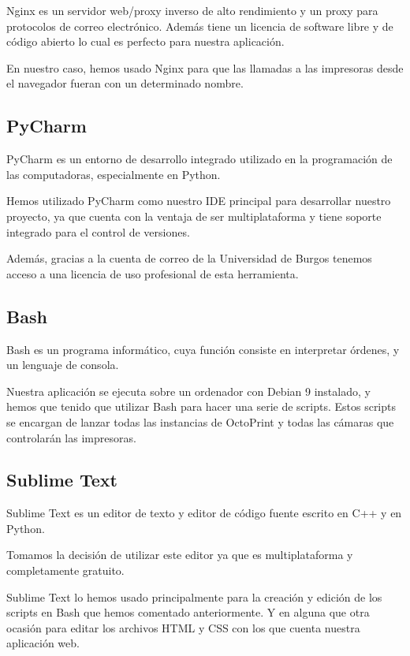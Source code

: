 Nginx \cite{wiki:nginx} es un servidor web/proxy inverso de alto rendimiento y un proxy para protocolos de correo electrónico. Además tiene un licencia de software libre y de código abierto lo cual es perfecto para nuestra aplicación.

En nuestro caso, hemos usado Nginx para que las llamadas a las impresoras desde el navegador fueran con un determinado nombre.

\subsection{PyCharm}

PyCharm \cite{wiki:pycharm} es un entorno de desarrollo integrado utilizado en la programación de las computadoras, especialmente en Python.

Hemos utilizado PyCharm como nuestro IDE principal para desarrollar nuestro proyecto, ya que cuenta con la ventaja de ser multiplataforma y tiene soporte integrado para el control de versiones.

Además, gracias a la cuenta de correo de la Universidad de Burgos tenemos acceso a una licencia de uso profesional de esta herramienta.


\subsection{Bash}

Bash \cite{wiki:bash} es un programa informático, cuya función consiste en interpretar órdenes, y un lenguaje de consola.

Nuestra aplicación se ejecuta sobre un ordenador con Debian 9 instalado, y hemos que tenido que utilizar Bash para hacer una serie de scripts. Estos scripts se encargan de lanzar todas las instancias de OctoPrint y todas las cámaras que controlarán las impresoras.





\subsection{Sublime Text}

Sublime Text \cite{wiki:sublime} es un editor de texto y editor de código fuente escrito en C++ y en Python.

Tomamos la decisión de utilizar este editor ya que es multiplataforma y completamente gratuito.

Sublime Text lo hemos usado principalmente para la creación y edición de los scripts en Bash que hemos comentado anteriormente. Y en alguna que otra ocasión para editar los archivos HTML y CSS con los que cuenta nuestra aplicación web.



